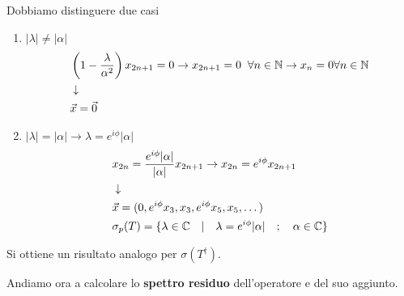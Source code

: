 \begin{enumerate}
	\newpage
	Dobbiamo distinguere due casi
	\begin{enumerate}
		\item $|\lambda| \neq |\alpha|$
		\begin{align}
			&\left(1 - \frac{\lambda}{\alpha^2}\right) x_{2n+1} = 0 \to x_{2n+1} = 0 \;\; \forall n \in \mathbb{N} \to x_n = 0 \forall n\in \mathbb{N} \\ &\downarrow \nonumber \\
			&\vec{x} = \vec{0}
		\end{align}
		\item $|\lambda| = |\alpha| \to \lambda = e^{i\phi} |\alpha|$
		\begin{align}
			&x_{2n} =\frac{e^{i\phi} |\alpha|}{|\alpha|} x_{2n+1} \to x_{2n} = e^{i\phi}x_{2n+1}\\ &\downarrow \nonumber \\
			&\vec{x} = (0, e^{i\phi}x_{3}, x_3, e^{i\phi}x_{5}, x_5,\dots)\\
			&\sigma_p(T) = \{ \lambda \in \mathbb{C} \quad|\quad \lambda = e^{i\phi} |\alpha| \quad ; \quad \alpha \in \mathbb{C} \}
		\end{align}
	\end{enumerate}
\end{enumerate}

Si ottiene un risultato analogo per $\sigma(T^\dagger)$.

Andiamo ora a calcolare lo \textbf{spettro residuo} dell'operatore e del suo aggiunto.

